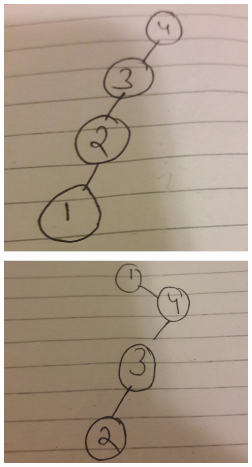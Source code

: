 \documentclass{article}
\begin{document}
\includegraphics[scale=0.05]{7.jpg}



\includegraphics[scale=0.05]{8.jpg}
\end{document}
